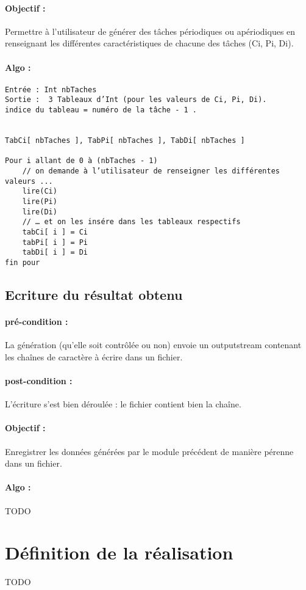 		\paragraph{Objectif :} Permettre à l’utilisateur de générer des tâches périodiques ou apériodiques en renseignant les différentes caractéristiques de chacune des tâches (Ci, Pi, Di).
		\paragraph{Algo :} 
			\begin{verbatim}
Entrée : Int nbTaches
Sortie :  3 Tableaux d’Int (pour les valeurs de Ci, Pi, Di). 
indice du tableau = numéro de la tâche - 1 .


TabCi[ nbTaches ], TabPi[ nbTaches ], TabDi[ nbTaches ]
		
Pour i allant de 0 à (nbTaches - 1)
	// on demande à l’utilisateur de renseigner les différentes valeurs ...
	lire(Ci)
	lire(Pi)
	lire(Di)        
	// … et on les insére dans les tableaux respectifs
	tabCi[ i ] = Ci
	tabPi[ i ] = Pi
	tabDi[ i ] = Di
fin pour
			\end{verbatim}

	\subsection{Ecriture du résultat obtenu}
		\paragraph{pré-condition :} La génération (qu'elle soit contrôlée ou non) envoie un outputstream contenant les chaînes de caractère à écrire dans un fichier.
		\paragraph{post-condition :} L'écriture s'est bien déroulée : le fichier contient bien la chaîne.
		\paragraph{Objectif :} Enregistrer les données générées par le module précédent de manière pérenne dans un fichier.
		\paragraph{Algo :}
		\Huge
		TODO
		\normalsize

\section{Définition de la réalisation}
	\Huge
	TODO
	\normalsize

